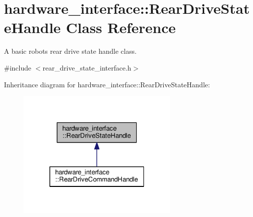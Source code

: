 \hypertarget{classhardware__interface_1_1RearDriveStateHandle}{}\section{hardware\+\_\+interface\+:\+:Rear\+Drive\+State\+Handle Class Reference}
\label{classhardware__interface_1_1RearDriveStateHandle}


A basic robot\textquotesingle{}s rear drive state handle class.  




{\ttfamily \#include $<$rear\+\_\+drive\+\_\+state\+\_\+interface.\+h$>$}



Inheritance diagram for hardware\+\_\+interface\+:\+:Rear\+Drive\+State\+Handle\+:\nopagebreak
\begin{figure}[H]
\begin{center}
\leavevmode
\includegraphics[width=223pt]{classhardware__interface_1_1RearDriveStateHandle__inherit__graph}
\end{center}
\end{figure}
